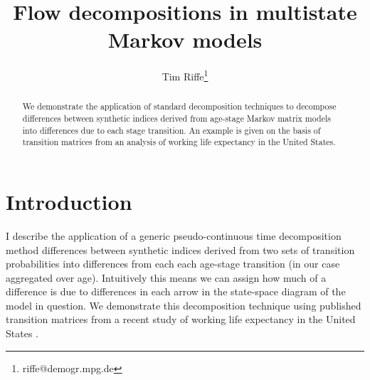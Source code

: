 \documentclass{article}
\begin{document}
\title{Flow decompositions in multistate Markov models}
\author[1]{Tim Riffe\thanks{riffe@demogr.mpg.de}}
\maketitle

\begin{abstract}
We demonstrate the application of standard decomposition techniques to decompose
differences between synthetic indices derived from age-stage Markov matrix
models into differences due to each stage transition. An example is given on the basis
of transition matrices from an analysis of working life expectancy in the
United States.
\end{abstract}

\section{Introduction}
I describe the application of a generic pseudo-continuous time decomposition
method \citep{horiuchi2008} differences between synthetic indices derived
from two sets of transition probabilities into differences from each each
age-stage transition (in our case aggregated over age). Intuitively this means
we can assign how much of a difference is due to differences in each arrow in
the state-space diagram of the model in question. We demonstrate this
decomposition technique using published transition matrices from a recent study
of working life expectancy in the United States \citep{Dudel2017}.

\singlespacing

   
\end{document}
